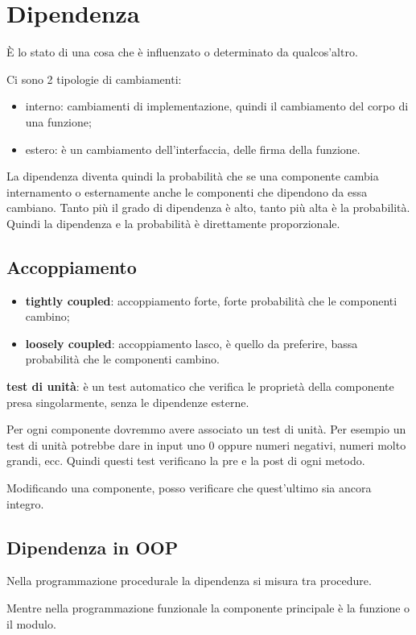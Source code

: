 \section{Dipendenza}
È lo stato di una cosa che è influenzato o determinato da qualcos'altro.

Ci sono 2 tipologie di cambiamenti:
\begin{itemize}
\item interno: cambiamenti di implementazione, quindi il cambiamento del corpo di una funzione;
\item estero: è un cambiamento dell’interfaccia, delle firma della funzione.
\end{itemize}

La dipendenza diventa quindi la probabilità che se una componente cambia internamento o esternamente anche le componenti che dipendono da essa cambiano. Tanto più il grado di dipendenza è alto, tanto più alta è la probabilità. Quindi la dipendenza e la probabilità è direttamente proporzionale.

\subsection{Accoppiamento}
\begin{itemize}
\item \textbf{tightly coupled}: accoppiamento forte, forte probabilità che le componenti cambino;
\item \textbf{loosely coupled}: accoppiamento lasco, è quello da preferire, bassa probabilità che le componenti cambino.
\end{itemize}

\textbf{test di unità}: è un test automatico che verifica le proprietà della componente presa singolarmente, senza le dipendenze esterne.

Per ogni componente dovremmo avere associato un test di unità. Per esempio un test di unità potrebbe dare in input uno 0 oppure numeri negativi, numeri molto grandi, ecc. Quindi questi test verificano la pre e la post di ogni metodo.

Modificando una componente, posso verificare che quest’ultimo sia ancora integro.

\subsection{Dipendenza in OOP}
Nella programmazione procedurale la dipendenza si misura tra procedure.

Mentre nella programmazione funzionale la componente principale è la funzione o il modulo.

